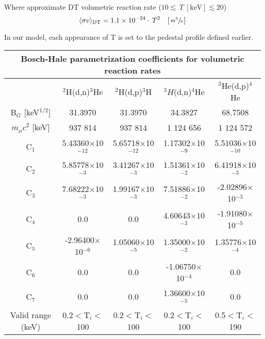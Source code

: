 Where approximate DT volumetric reaction rate ($10\lesssim~T~\mathrm{[keV]}\lesssim20$)
\begin{equation}
		\langle\sigma v\rangle_\mathrm{DT} = 1.1\times10^{-24} \cdot  \, T^2   \ \ \ [ \, \sfrac{ \textnormal{m}^3 }{ \textnormal{s} } \, ]
\end{equation}

In our model, each appearance of T is set to the pedestal profile defined earlier.

\begin{table}[h!]\small
  \noindent
  \centering
  \begin{tabular}{c | c c | c | c}
    \multicolumn{5}{c}{Bosch-Hale parametrization coefficients for volumetric reaction rates}\\
    \hline
    & $^2$H(d,n)$^3$He & $^2$H(d,p)$^3$H & $^3H$(d,n)$^4$He & $^3$He(d,p)$^4$He\\
    \hline\hline
    B$_G$ [keV$^{1/2}$] & 31.3970 & 31.3970 & 34.3827   & 68.7508 \\
    $m_\mu c^2$ [keV]   & 937 814 & 937 814 & 1 124 656 & 1 124 572 \\
    \hline
    C$_1$& 5.43360$\times$10$^{-12}$  & 5.65718$\times$10$^{-12}$ & 1.17302$\times$10$^{-9}$  & 5.51036$\times$10$^{-10}$ \\ 
    C$_2$  & 5.85778$\times$10$^{-3}$   & 3.41267$\times$10$^{-3}$  & 1.51361$\times$10$^{-2}$  & 6.41918$\times$10$^{-3}$ \\
    C$_3$  & 7.68222$\times$10$^{-3}$   & 1.99167$\times$10$^{-3}$  & 7.51886$\times$10$^{-2}$  & -2.02896$\times$10$^{-3}$ \\
    C$_4$  & 0.0                        & 0.0                       & 4.60643$\times$10$^{-3}$  & -1.91080$\times$10$^{-5}$ \\
    C$_5$  & -2.96400$\times$10$^{-6}$  & 1.05060$\times$10$^{-5}$  & 1.35000$\times$10$^{-2}$  & 1.35776$\times$10$^{-4}$ \\
    C$_6$  & 0.0                        & 0.0                       & -1.06750$\times$10$^{-4}$ & 0.0 \\
    C$_7$& 0.0                      & 0.0                       & 1.36600$\times$10$^{-5}$  & 0.0 \\
    \hline
    Valid range (keV) & 0.2$<$T$_i<$100 & 0.2$<$T$_i<$100 & 0.2$<$T$_i<$100 & 0.5$<$T$_i<$190\\
    \hline
  \end{tabular}
  \label{table:rrParam}
\end{table}

